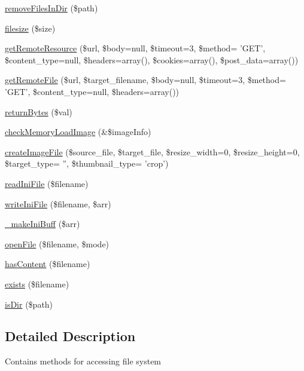 \begin{DoxyCompactItemize}
\hyperlink{classFileHandler_a07839b4971e9ef40039d23ea65977d69}{remove\+Files\+In\+Dir} (\$path)
\item 
\hyperlink{classFileHandler_ae235b4ded589fb13caed260fabc0a30c}{filesize} (\$size)
\item 
\hyperlink{classFileHandler_a10c592d59693d8d7f313ca962d4c40ce}{get\+Remote\+Resource} (\$url, \$body=null, \$timeout=3, \$method= 'G\+E\+T', \$content\+\_\+type=null, \$headers=array(), \$cookies=array(), \$post\+\_\+data=array())
\item 
\hyperlink{classFileHandler_a41e633e2f59cffddd5d5ffae1e3639c7}{get\+Remote\+File} (\$url, \$target\+\_\+filename, \$body=null, \$timeout=3, \$method= 'G\+E\+T', \$content\+\_\+type=null, \$headers=array())
\item 
\hyperlink{classFileHandler_a79dd068137470965b560f4d23d978e7d}{return\+Bytes} (\$val)
\item 
\hyperlink{classFileHandler_a0b240e89b6ce57cb94e855fc25e5e9f3}{check\+Memory\+Load\+Image} (\&\$image\+Info)
\item 
\hyperlink{classFileHandler_a171948d79c14415ad45b7581a011c593}{create\+Image\+File} (\$source\+\_\+file, \$target\+\_\+file, \$resize\+\_\+width=0, \$resize\+\_\+height=0, \$target\+\_\+type= '', \$thumbnail\+\_\+type= 'crop')
\item 
\hyperlink{classFileHandler_a58a8bbae1ab4acb358599db38a47db4d}{read\+Ini\+File} (\$filename)
\item 
\hyperlink{classFileHandler_aa0fd9ce8f2c81bee472a403e75b578bd}{write\+Ini\+File} (\$filename, \$arr)
\item 
\hyperlink{classFileHandler_a8975f9247987757497e0288f3ee09173}{\+\_\+make\+Ini\+Buff} (\$arr)
\item 
\hyperlink{classFileHandler_a690753d8cf8ff837f28a811cdfbfa069}{open\+File} (\$filename, \$mode)
\item 
\hyperlink{classFileHandler_ad872016e83b1f62a03d54e359ce31f73}{has\+Content} (\$filename)
\item 
\hyperlink{classFileHandler_a862c4f6349792ae8f094ec456c9a26ed}{exists} (\$filename)
\item 
\hyperlink{classFileHandler_a5fd371542d6f1a86269d0b8795e74471}{is\+Dir} (\$path)
\end{DoxyCompactItemize}


\subsection{Detailed Description}
Contains methods for accessing file system

